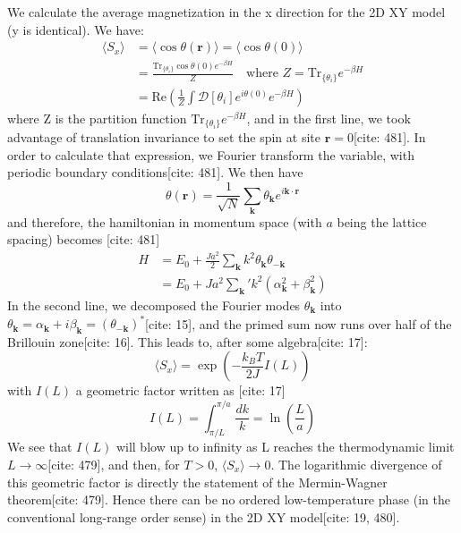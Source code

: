 \documentclass[11pt]{article}
\begin{document}
We calculate the average magnetization in the x direction for the 2D XY model (y is identical). We have:
\begin{align}
\langle S_x \rangle &= \langle \cos \theta(\mathbf{r}) \rangle = \langle \cos \theta(0) \rangle \label{eq:avg_sx_def1} \\
&= \frac{\text{Tr}_{\{\theta_i\}} \cos \theta(0) e^{-\beta H}}{Z} \quad \text{where } Z = \text{Tr}_{\{\theta_i\}} e^{-\beta H} \label{eq:avg_sx_def2} \\
&= \text{Re} \left( \frac{1}{Z} \int \mathcal{D}[\theta_i] e^{i \theta(0)} e^{-\beta H} \right) \label{eq:avg_sx_def3}
\end{align}
where Z is the partition function $\text{Tr}_{\{\theta_i\}} e^{-\beta H}$, and in the first line, we took advantage of translation invariance to set the spin at site $\mathbf{r}=0$[cite: 481]. In order to calculate that expression, we Fourier transform the variable, with periodic boundary conditions[cite: 481]. We then have
\begin{equation}
\theta(\mathbf{r}) = \frac{1}{\sqrt{N}} \sum_{\mathbf{k}} \theta_{\mathbf{k}} e^{i \mathbf{k} \cdot \mathbf{r}} \label{eq:theta_fourier}
\end{equation}
and therefore, the hamiltonian in momentum space (with $a$ being the lattice spacing) becomes [cite: 481]
\begin{align}
H &= E_0 + \frac{J a^2}{2} \sum_{\mathbf{k}} k^2 \theta_{\mathbf{k}} \theta_{-\mathbf{k}} \nonumber \\
  &= E_0 + J a^2 \sum_{\mathbf{k}}' k^2 (\alpha_{\mathbf{k}}^2 + \beta_{\mathbf{k}}^2) \label{eq:H_kspace}
\end{align}
In the second line, we decomposed the Fourier modes $\theta_{\mathbf{k}}$ into $\theta_{\mathbf{k}} = \alpha_{\mathbf{k}} + i \beta_{\mathbf{k}} = (\theta_{-\mathbf{k}})^*$[cite: 15], and the primed sum now runs over half of the Brillouin zone[cite: 16]. This leads to, after some algebra[cite: 17]:
\begin{equation}
\langle S_x \rangle = \exp\left(-\frac{k_B T}{2J} I(L)\right) \label{eq:Sx_result}
\end{equation}
with $I(L)$ a geometric factor written as [cite: 17]
\begin{equation}
I(L) = \int_{\pi/L}^{\pi/a} \frac{dk}{k} = \ln\left(\frac{L}{a}\right) \label{eq:IL_def}
\end{equation}
We see that $I(L)$ will blow up to infinity as L reaches the thermodynamic limit $L \to \infty$[cite: 479], and then, for $T > 0$, $\langle S_x \rangle \to 0$. The logarithmic divergence of this geometric factor is directly the statement of the Mermin-Wagner theorem[cite: 479]. Hence there can be no ordered low-temperature phase (in the conventional long-range order sense) in the 2D XY model[cite: 19, 480].
\end{document}
